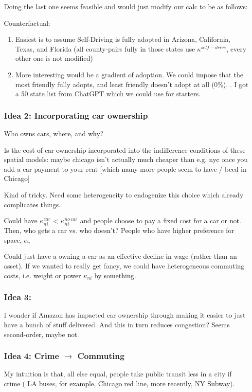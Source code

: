 \documentclass{article}
\begin{document}
Doing the last one seems feasible and would just modify our calc to be as follows:



Counterfactual:

\begin{enumerate}
\item Easiest is to assume Self-Driving is fully adopted in Arizona, California, Texas, and Florida (all county-pairs fully in those states use $\kappa^{self-drive}$, every other one is not modified)
\item More interesting would be a gradient of adoption. We could impose that the most friendly fully adopts, and least friendly doesn't adopt at all (0\%). . I got a 50 state list from ChatGPT which we could use for starters.
\end{enumerate}

\subsubsection{Idea 2: Incorporating car ownership}
Who owns cars, where, and why?

Is the cost of car ownership incorporated into the indifference conditions of these spatial models: maybe chicago isn't actually much cheaper than e.g. nyc once you add a car payment to your rent [which many more people seem to have / beed in Chicago] 


Kind of tricky. Need some heterogeneity to endogenize this choice which already complicates things.

Could have $\kappa^{car}_{ni}$ <
$\kappa^{no \ car}_{ni} $ and people choose to pay a fixed cost for a car or not. 
Then, who gets a car vs. who doesn't? 
People who have higher preference for space, $\alpha_i$

Could just have a owning a car as an effective decline in wage (rather than an asset).
If we wanted to really get fancy, we could have heterogeneous commuting costs, i.e. weight or power $\kappa_{ni}$ by something. 


\subsubsection{Idea 3: }
I wonder if Amazon has impacted car ownership through making it easier to just have a bunch of stuff delivered. 
And this in turn reduces congestion? Seems second-order, maybe not.

\subsubsection{Idea 4: Crime $\rightarrow$ Commuting}
My intuition is that, all else equal, people take public transit less in a city if crime ( LA buses, for example, Chicago red line, more recently, NY Subway).
\end{document}
